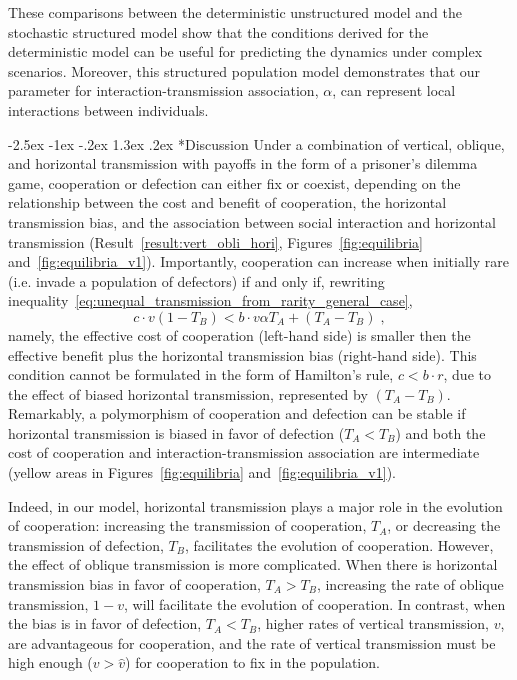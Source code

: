 \documentclass[12pt]{extarticle}
\makeatletter
\renewcommand\section{\@startsection {section}{1}{\z@}%
     {-2.5ex \@plus -1ex \@minus -.2ex}%
     {1.3ex \@plus.2ex}%
    {\Large\bfseries}}
\makeatother
\begin{document}
These comparisons between the deterministic unstructured model and the stochastic structured model show that the conditions derived for the deterministic model can be useful for predicting the dynamics under complex scenarios. 
Moreover, this structured population model demonstrates that our parameter for interaction-transmission association, $\alpha$, can represent local interactions between individuals.


\section*{Discussion}
Under a combination of vertical, oblique, and horizontal transmission with payoffs in the form of a prisoner's dilemma game, cooperation or defection can either fix or coexist, depending on the relationship between the cost and benefit of cooperation, the horizontal transmission bias, and the association between social interaction and horizontal transmission (Result~\ref{result:vert_obli_hori}, Figures~\ref{fig:equilibria} and~\ref{fig:equilibria_v1}).
Importantly, cooperation can increase when initially rare (i.e. invade a population of defectors) if and only if, rewriting inequality~\ref{eq:unequal_transmission_from_rarity_general_case},
\begin{equation}
c \cdot v (1-T_B) < b \cdot v \alpha T_A + (T_A - T_B) \;,
\end{equation}
namely, the effective cost of cooperation (left-hand side) is smaller then the effective benefit plus the horizontal transmission bias (right-hand side).
This condition cannot be formulated in the form of Hamilton's rule, $c<b \cdot r$, due to the effect of biased horizontal transmission, represented by $(T_A-T_B)$.
Remarkably, a polymorphism of cooperation and defection can be stable if horizontal transmission is biased in favor of defection ($T_A<T_B$) and both the cost of cooperation and interaction-transmission association are intermediate (yellow areas in Figures~\ref{fig:equilibria} and~\ref{fig:equilibria_v1}).

Indeed, in our model, horizontal transmission plays a major role in the evolution of cooperation: increasing the transmission of cooperation, $T_A$, or decreasing the transmission of defection, $T_B$, facilitates the evolution of cooperation. 
However, the effect of oblique transmission is more complicated.
When there is horizontal transmission bias in favor of cooperation, $T_A>T_B$, increasing the rate of oblique transmission, $1-v$, will facilitate the evolution of cooperation.
In contrast, when the bias is in favor of defection, $T_A<T_B$, higher rates of vertical transmission, $v$, are advantageous for cooperation, and the rate of vertical transmission must be high enough ($v>\hat v$) for cooperation to fix in the population.
\end{document}
